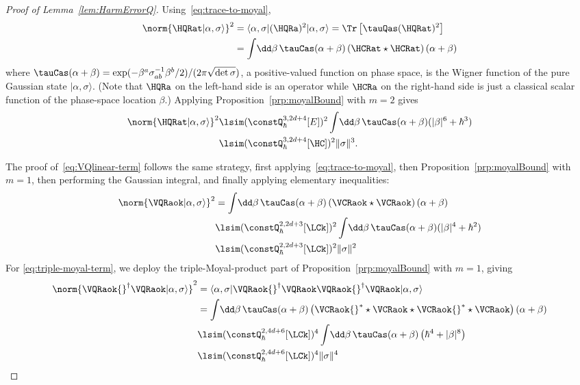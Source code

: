 \documentclass{article}
\numberwithin{equation}{section}
\begin{document}
\begin{proof}[Proof of Lemma~\ref{lem:HarmErrorQ}]
Using~\eqref{eq:trace-to-moyal},
\begin{align}\begin{split}\label{eq:delta-h-vec-norm-squared}
		\norm{\HQRat|\alpha,\sigma \rangle}^2 &= \langle\alpha,\sigma |(\HQRa)^2|\alpha,\sigma \rangle = \Tr\left[\tauQas(\HQRat)^2\right] \\
		&= \int \!\dd \beta\, \tauCas(\alpha+\beta)\left(\HCRat \star \HCRat\right)(\alpha+\beta)
	\end{split}
\end{align}
where $\tauCas(\alpha+\beta) = \exp(-\beta^a\sigma^{-1}_{ab}\beta^b/2)/(2 \pi\sqrt{\det\sigma})$, a positive-valued function on phase space,
is the Wigner function of the pure Gaussian state $|\alpha,\sigma \rangle$.  (Note that $\HQRa$ on the left-hand side is an operator while $\HCRa$ on the right-hand side is just a classical scalar function of the phase-space location $\beta$.)
Applying Proposition~\ref{prp:moyalBound} with $m=2$ gives
\begin{align}
	\begin{split}
		\norm{\HQRat|\alpha,\sigma \rangle}^2
		&\lsim 
		(\constQ^{3,2d+4}_{\hbar}[E])^2 \int \!\dd \beta\, \tauCas(\alpha+\beta) (|\beta|^{6} + \hbar^{3}) \\
  &\lsim (\constQ^{3,2d+4}_{\hbar}[\HC])^2 \|\sigma\|^3.
\end{split}\end{align}

	
	The proof of~\eqref{eq:VQlinear-term} follows the same strategy, first applying~\eqref{eq:trace-to-moyal}, then Proposition~\ref{prp:moyalBound} with $m=1$, then performing the Gaussian integral, and finally applying elementary inequalities:
	\begin{align}
		\norm{\VQRaok|\alpha,\sigma \rangle }^2
		&= \int \!\dd \beta\, \tauCas(\alpha+\beta)\left(\VCRaok \star \VCRaok\right)(\alpha+\beta)\\
		&\lsim 
		(\constQ^{2,2d+3}_{\hbar}[\LCk])^2 \int \!\dd \beta\, \tauCas(\alpha+\beta) (|\beta|^{4} + \hbar^{2})\\	
		&\lsim 
  (\constQ^{2,2d+3}_{\hbar}[\LCk])^2 \|\sigma\|^2 
	\end{align}
	For \eqref{eq:triple-moyal-term}, we deploy the triple-Moyal-product part of Proposition~\ref{prp:moyalBound} with $m=1$, giving
	\begin{align}
		\norm{ \VQRaok{}^\dagger  \VQRaok |\alpha,\sigma \rangle}^2 
		&= \langle \alpha,\sigma | \VQRaok{}^\dagger \VQRaok \VQRaok{}^\dagger \VQRaok | \alpha,\sigma \rangle \\
		&= \int \!\dd \beta\, \tauCas(\alpha+\beta) \left(\VCRaok{}^* \star\VCRaok\star \VCRaok{}^* \star\VCRaok \right)(\alpha+\beta)\\
		&\lsim
		(\constQ^{2,4d+6}_{\hbar}[\LCk])^4
		\int \!\dd \beta\,  \tauCas(\alpha+\beta)
		\left(\hbar^{4}+|\beta|^{8}\right)\\
		&\lsim  
  (\constQ^{2,4d+6}_{\hbar}[\LCk])^4 \|\sigma\|^4
	\end{align}
	

\end{proof}
\end{document}
